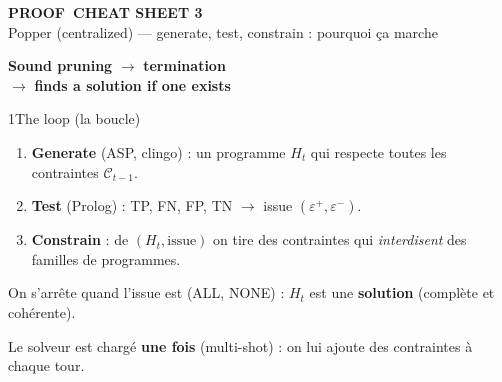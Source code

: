 \documentclass[10pt]{article}
\begin{document}
\begin{minipage}[c]{0.64\textwidth}
  {\fontsize{26}{28}\selectfont\bfseries\textcolor{marine}{PROOF}~CHEAT SHEET 3}\\[1pt]
  {\small Popper (centralized) --- generate, test, constrain : pourquoi ça marche}
\end{minipage}\hfill
\begin{minipage}[c]{0.34\textwidth}\raggedright
  \normalsize \textbf{Sound pruning} $\to$ \textbf{termination}\\ $\to$ \textbf{finds a solution if one exists}
\end{minipage}

\vspace{5pt}

\begin{minipage}[t]{0.32\textwidth}
\begin{bloc}{\num{1}The loop (la boucle)}
\begin{enumerate}[leftmargin=12pt, itemsep=1pt, topsep=1pt]
  \item \textbf{Generate} (ASP, clingo) : un programme $H_t$ qui respecte toutes les contraintes $\mathcal{C}_{t-1}$.
  \item \textbf{Test} (Prolog) : TP, FN, FP, TN $\to$ issue $(\varepsilon^+,\varepsilon^-)$.
  \item \textbf{Constrain} : de $(H_t,\text{issue})$ on tire des contraintes qui \emph{interdisent} des familles de programmes.
\end{enumerate}
On s'arrête quand l'issue est (ALL, NONE) : $H_t$ est une \textbf{solution} (complète et cohérente).
\begin{astuce}
Le solveur est chargé \textbf{une fois} (multi-shot) : on lui ajoute des contraintes à chaque tour.
\end{astuce}
\end{bloc}
\end{minipage}\hfill
\end{document}
